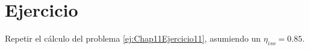 \section{Ejercicio}\label{ej:Chap11Ejercicio12}
Repetir el cálculo del problema \ref{ej:Chap11Ejercicio11}, asumiendo un $\eta_{iso}=0.85$.